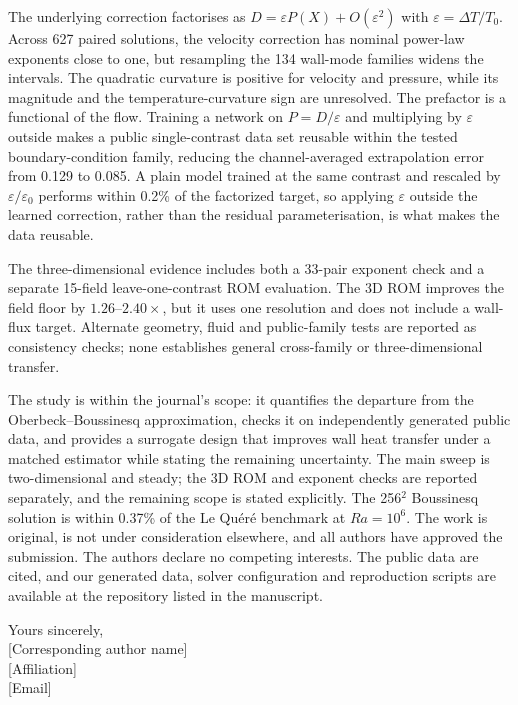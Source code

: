 \documentclass[11pt]{article}
\begin{document}
The underlying correction factorises as $D=\varepsilon P(X)+O(\varepsilon^2)$ with
$\varepsilon=\Delta T/T_0$. Across 627 paired solutions, the velocity correction has nominal
power-law exponents close to one, but resampling the 134 wall-mode families widens the
intervals. The quadratic curvature is positive for velocity and pressure, while its magnitude
and the temperature-curvature sign are unresolved. The prefactor is a functional of the flow.
Training a network on $P=D/\varepsilon$ and multiplying by $\varepsilon$ outside
makes a public single-contrast data set reusable within the tested boundary-condition family, reducing
the channel-averaged extrapolation error from 0.129 to 0.085. A plain model trained at the same
contrast and rescaled by $\varepsilon/\varepsilon_0$ performs within 0.2\% of the factorized
target, so applying $\varepsilon$ outside the learned correction, rather than the residual
parameterisation, is what makes the data reusable.

The three-dimensional evidence includes both a 33-pair exponent check and a separate 15-field
leave-one-contrast ROM evaluation. The 3D ROM improves the field floor by $1.26$--$2.40\times$,
but it uses one resolution and does not include a wall-flux target. Alternate geometry, fluid and
public-family tests are reported as consistency checks; none establishes general cross-family
or three-dimensional transfer.

The study is within the journal's scope: it quantifies the departure from the
Oberbeck--Boussinesq approximation, checks it on independently generated public data, and
provides a surrogate design that improves wall heat transfer under a matched estimator while
stating the remaining uncertainty. The main sweep is two-dimensional and steady; the 3D ROM
and exponent checks are reported separately, and the remaining scope is stated explicitly. The 256$^2$ Boussinesq solution is within 0.37\% of the
Le Qu\'er\'e benchmark at $Ra=10^6$. The work is original, is not under consideration
elsewhere, and all authors have approved the submission. The authors declare no competing
interests. The public data are cited, and our generated data, solver configuration and
reproduction scripts are available at the repository listed in the manuscript.

\vspace{4pt}
\noindent
Yours sincerely,\\
{[Corresponding author name]}\\
{[Affiliation]}\\
{[Email]}
\end{document}
